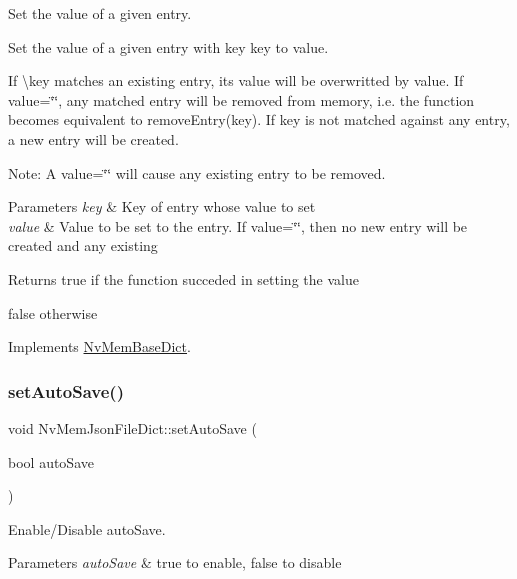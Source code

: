 Set the value of a given entry. 

Set the value of a given entry with key {\ttfamily key} to {\ttfamily value}.

If \textbackslash{}key matches an existing entry, its value will be overwritted by {\ttfamily value}. If {\ttfamily value=\char`\"{}\char`\"{}}, any matched entry will be removed from memory, i.\+e. the function becomes equivalent to remove\+Entry(key). If {\ttfamily key} is not matched against any entry, a new entry will be created.

Note\+: A {\ttfamily value=\char`\"{}\char`\"{}} will cause any existing entry to be removed.


\begin{DoxyParams}{Parameters}
{\em key} & Key of entry whose value to set \\
\hline
{\em value} & Value to be set to the entry. If {\ttfamily value=\char`\"{}\char`\"{}}, then no new entry will be created and any existing \\
\hline
\end{DoxyParams}
\begin{DoxyReturn}{Returns}
true if the function succeded in setting the value 

false otherwise 
\end{DoxyReturn}


Implements \mbox{\hyperlink{class_nv_mem_base_dict_aac0c8ea17230b315ff906bce84e94124}{Nv\+Mem\+Base\+Dict}}.

\mbox{\label{class_nv_mem_json_file_dict_a4896c91e42b5d444825417850e2f0f90}} 
\subsubsection{\texorpdfstring{setAutoSave()}{setAutoSave()}}
{\footnotesize\ttfamily void Nv\+Mem\+Json\+File\+Dict\+::set\+Auto\+Save (\begin{DoxyParamCaption}\item[{bool}]{auto\+Save }\end{DoxyParamCaption})}



Enable/\+Disable auto\+Save. 


\begin{DoxyParams}{Parameters}
{\em auto\+Save} & {\ttfamily true} to enable, {\ttfamily false} to disable \\
\hline
\end{DoxyParams}
\mbox{\label{class_nv_mem_json_file_dict_a7b4c2899c4ed3cf1e33d69cbec83efe7}} 

